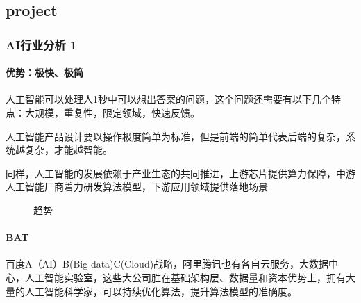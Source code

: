 \documentclass[letterpaper,11pt,english]{sphinxmanual}
\begin{document}
\subsection{project}
\label{\detokenize{chapter_project/index:project}}\label{\detokenize{chapter_project/index:chap-project}}\label{\detokenize{chapter_project/index::doc}}

\subsubsection{AI行业分析 1\sphinxfootnotemark[224]}
\label{\detokenize{chapter_project/AI_industry_analysis:ai-1}}\label{\detokenize{chapter_project/AI_industry_analysis::doc}}%
\begin{footnotetext}[224]\sphinxAtStartFootnote
{}
%
\end{footnotetext}\ignorespaces 
\begin{center}\end{center} 


\paragraph{优势：极快、极简}
\label{\detokenize{chapter_project/AI_industry_analysis:id1}}
人工智能可以处理人1秒中可以想出答案的问题，这个问题还需要有以下几个特点：大规模，重复性，限定领域，快速反馈。

人工智能产品设计要以操作极度简单为标准，但是前端的简单代表后端的复杂，系统越复杂，才能越智能。

同样，人工智能的发展依赖于产业生态的共同推进，上游芯片提供算力保障，中游人工智能厂商着力研发算法模型，下游应用领域提供落地场景

\begin{figure}[H]
\centering
\capstart

\noindent{}
\caption{趋势}\label{\detokenize{chapter_project/AI_industry_analysis:id12}}\end{figure}


\paragraph{BAT}
\label{\detokenize{chapter_project/AI_industry_analysis:bat}}
百度A（AI）B(Big
data)C(Cloud)战略，阿里腾讯也有各自云服务，大数据中心，人工智能实验室，这些大公司胜在基础架构层、数据量和资本优势上，拥有大量的人工智能科学家，可以持续优化算法，提升算法模型的准确度。
\end{document}
